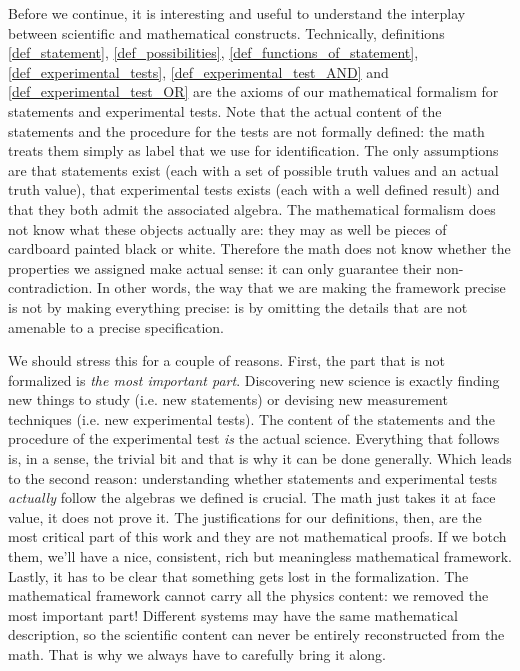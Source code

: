 \documentclass[11pt,letterpaper,fleqn]{memoir} %
\begin{document}
Before we continue, it is interesting and useful to understand the interplay between scientific and mathematical constructs. Technically, definitions \ref{def_statement}, \ref{def_possibilities}, \ref{def_functions_of_statement}, \ref{def_experimental_tests}, \ref{def_experimental_test_AND} and \ref{def_experimental_test_OR} are the axioms of our mathematical formalism for statements and experimental tests. Note that the actual content of the statements and the procedure for the tests are not formally defined: the math treats them simply as label that we use for identification. The only assumptions are that statements exist (each with a set of possible truth values and an actual truth value), that experimental tests exists (each with a well defined result) and that they both admit the associated algebra. The mathematical formalism does not know what these objects actually are: they may as well be pieces of cardboard painted black or white. Therefore the math does not know whether the properties we assigned make actual sense: it can only guarantee their non-contradiction. In other words, the way that we are making the framework precise is not by making everything precise: is by omitting the details that are not amenable to a precise specification.

We should stress this for a couple of reasons. First, the part that is not formalized is \emph{the most important part}. Discovering new science is exactly finding new things to study (i.e. new statements) or devising new measurement techniques (i.e. new experimental tests). The content of the statements and the procedure of the experimental test \emph{is} the actual science. Everything that follows is, in a sense, the trivial bit and that is why it can be done generally. Which leads to the second reason: understanding whether statements and experimental tests \emph{actually} follow the algebras we defined is crucial. The math just takes it at face value, it does not prove it. The justifications for our definitions, then, are the most critical part of this work and they are not mathematical proofs. If we botch them, we'll have a nice, consistent, rich but meaningless mathematical framework. Lastly, it has to be clear that something gets lost in the formalization. The mathematical framework cannot carry all the physics content: we removed the most important part! Different systems may have the same mathematical description, so the scientific content can never be entirely reconstructed from the math. That is why we always have to carefully bring it along.
\end{document}
